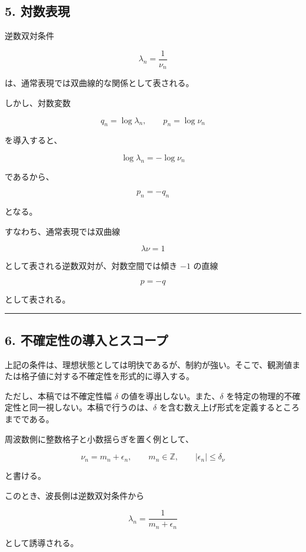 \documentclass[
]{ltjsarticle}
\begin{document}
\subsection{5. 対数表現}\label{ux5bfeux6570ux8868ux73fe}

逆数双対条件

\[
\lambda_n=\frac{1}{\nu_n}
\]

は、通常表現では双曲線的な関係として表される。

しかし、対数変数

\[
q_n=\log\lambda_n,\qquad
p_n=\log\nu_n
\]

を導入すると、

\[
\log\lambda_n=-\log\nu_n
\]

であるから、

\[
p_n=-q_n
\]

となる。

すなわち、通常表現では双曲線

\[
\lambda\nu=1
\]

として表される逆数双対が、対数空間では傾き \(-1\) の直線

\[
p=-q
\]

として表される。

\begin{center}\rule{0.5\linewidth}{0.5pt}\end{center}

\subsection{6.
不確定性の導入とスコープ}\label{ux4e0dux78baux5b9aux6027ux306eux5c0eux5165ux3068ux30b9ux30b3ux30fcux30d7}

上記の条件は、理想状態としては明快であるが、制約が強い。そこで、観測値または格子値に対する不確定性を形式的に導入する。

ただし、本稿では不確定性幅 \(\delta\) の値を導出しない。また、\(\delta\)
を特定の物理的不確定性と同一視しない。本稿で行うのは、\(\delta\)
を含む数え上げ形式を定義するところまでである。

周波数側に整数格子と小数揺らぎを置く例として、

\[
\nu_n=m_n+\epsilon_n,\qquad
m_n\in\mathbb{Z},\qquad
|\epsilon_n|\le \delta_\nu
\]

と書ける。

このとき、波長側は逆数双対条件から

\[
\lambda_n=\frac{1}{m_n+\epsilon_n}
\]

として誘導される。
\end{document}
